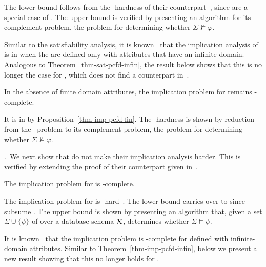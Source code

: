 \proofs The lower bound follows from the
\coNP-hardness of their \CFDs counterpart~\cite{CFDs}, since \CFDs
are a special case of \pCFDs. The \coNP upper bound is verified
by presenting an \NP algorithm for its complement problem, \ie
the problem for determining whether $\Sigma\not\models\varphi$. \eop
\vspace{0.5ex}

Similar to the satisfiability analysis,
it is known~\cite{CFDs} that the implication analysis of
\CFDs is in \PTIME when the \CFDs are defined only with attributes that
have an infinite domain. Analogous to Theorem~\ref{thm-sat-pcfd-infin},
the result below shows that this is no longer the case for \pCFDs,
which does not find a counterpart in~\cite{CFDs}.

\begin{theorem}
\label{thm-imp-pcfd-infin} In the absence of finite domain
attributes, the implication problem for \pCFDs remains
\coNP-complete. \eop
\end{theorem}
\vspace{-1ex}

\proofs It is in \coNP by
Proposition~\ref{thm-imp-pcfd-fin}. The \coNP-hardness is shown
by reduction from the \kSAT\ problem to its complement problem, \ie
the problem for determining whether $\Sigma\not\models\varphi$.
\eop
\vspace{0.5ex}


.~We next show that \pCINDs
do not make their implication
analysis harder. This is verified by extending the proof of
their \CINDs counterpart given in~\cite{CINDs}.

\begin{prop}
\label{thm-imp-pcind-fin}The implication problem for \pCINDs is
\EXPTIME-complete. \eop
\end{prop}
\vspace{-1ex}

\proofs The implication problem for \CINDs is
\EXPTIME-hard~\cite{CINDs}. The lower bound carries over to \pCINDs
since \pCINDs subsume \CINDs. The \EXPTIME upper bound is shown
by presenting an \EXPTIME algorithm that, given a set
$\Sigma\cup\{\psi\}$ of \pCINDs over a database schema $\cal R$,
determines whether $\Sigma\models\psi$. \eop
\vspace{0.5ex}

It is known~\cite{CINDs} that the implication problem is
\PSPACE-complete for \CINDs defined with infinite-domain
attributes. Similar to
Theorem~\ref{thm-imp-pcfd-infin}, below we present a new result
showing that this no longer holds for \pCINDs.


